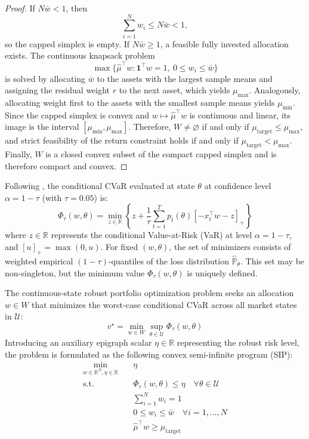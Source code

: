 \documentclass[smallextended]{svjour3}
\begin{document}
\begin{proof}
If $N\bar w<1$, then
\begin{equation}
\sum_{i=1}^{N}w_i\leq N\bar w<1,
\end{equation}
so the capped simplex is empty. If $N\bar w\geq1$, a feasible fully invested allocation exists. The continuous knapsack problem
\begin{equation}
\max\{\hat\mu^\top w:\mathbf 1^\top w=1,\ 0\leq w_i\leq\bar w\}
\end{equation}
is solved by allocating $\bar w$ to the assets with the largest sample means and assigning the residual weight $r$ to the next asset, which yields $\mu_{\max}$. Analogously, allocating weight first to the assets with the smallest sample means yields $\mu_{\min}$. Since the capped simplex is convex and $w\mapsto\hat\mu^\top w$ is continuous and linear, its image is the interval $[\mu_{\min},\mu_{\max}]$. Therefore, $W\neq\varnothing$ if and only if $\mu_{\mathrm{target}}\leq\mu_{\max}$, and strict feasibility of the return constraint holds if and only if $\mu_{\mathrm{target}}<\mu_{\max}$. Finally, $W$ is a closed convex subset of the compact capped simplex and is therefore compact and convex.
\end{proof}

Following \citet{rockafellar2000optimization}, the conditional CVaR evaluated at state $\theta$ at confidence level $\alpha = 1 - \tau$ (with $\tau = 0.05$) is:
\begin{equation}
    \Phi_\tau(w, \theta) = \min_{z \in \mathbb{R}} \left\{ z + \frac{1}{\tau} \sum_{t=1}^T p_t(\theta) [-x_t^\top w - z]_+ \right\}
\end{equation}
where $z \in \mathbb{R}$ represents the conditional Value-at-Risk (VaR) at level $\alpha = 1 - \tau$, and $[u]_+ = \max(0, u)$. For fixed $(w,\theta)$, the set of minimizers consists of weighted empirical $(1-\tau)$-quantiles of the loss distribution $\widehat{\mathbb P}_\theta$. This set may be non-singleton, but the minimum value $\Phi_\tau(w,\theta)$ is uniquely defined.

The continuous-state robust portfolio optimization problem seeks an allocation $w \in W$ that minimizes the worst-case conditional CVaR across all market states in $\mathcal{U}$:
\begin{equation}
    v^\star = \min_{w \in W} \sup_{\theta \in \mathcal{U}} \Phi_\tau(w, \theta)
\end{equation}
Introducing an auxiliary epigraph scalar $\eta \in \mathbb{R}$ representing the robust risk level, the problem is formulated as the following convex semi-infinite program (SIP):
\begin{align}
    \min_{w \in \mathbb{R}^N, \eta \in \mathbb{R}} \quad & \eta \\
    \text{s.t.} \quad & \Phi_\tau(w, \theta) \le \eta \quad \forall \theta \in \mathcal{U} \\
    & \sum_{i=1}^N w_i = 1 \\
    & 0 \le w_i \le \bar{w} \quad \forall i=1,\dots,N \\
    & \hat{\mu}^\top w \ge \mu_{\text{target}}
\end{align}
\end{document}
